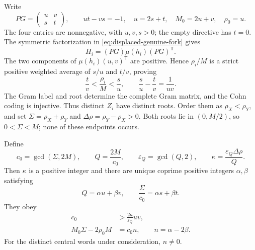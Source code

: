 Write
\begin{equation}
 PG=\begin{pmatrix}u&v\\s&t\end{pmatrix},\qquad
 ut-vs=-1,\quad u=2s+t,\quad
 M_0=2u+v,\quad\rho_0=u.
 \label{eq:displaced-prefix-frame}
\end{equation}
The four entries are nonnegative, with $u,v,s>0$; the empty directive has $t=0$. The symmetric factorization in \eqref{eq:displaced-genuine-fork} gives
$$
 H_i=(PG)\mu(h_i)(PG)^{\mathsf T}.
$$
The two components of $\mu(h_i)(u,v)^{\mathsf T}$ are positive. Hence $\rho_i/M$ is a strict positive weighted average of $s/u$ and $t/v$, proving
\begin{equation}
 \frac tv<\frac{\rho_i}{M}<\frac su,
 \qquad\frac su-\frac tv=\frac1{uv}.
 \label{eq:displaced-farey-interval}
\end{equation}
The Gram label and root determine the complete Gram matrix, and the Cohn coding is injective. Thus distinct $Z_i$ have distinct roots. Order them as $\rho_X<\rho_Y$, and set $\Sigma=\rho_X+\rho_Y$ and $\Delta\rho=\rho_Y-\rho_X>0$. Both roots lie in $(0,M/2)$, so $0<\Sigma<M$; none of these endpoints occurs.

\begin{lemma}
\label{lem:displaced-integer-direction}
Define
\begin{equation}
 c_0=\gcd(\Sigma,2M),\qquad Q=\frac{2M}{c_0},\qquad
 \varepsilon_Q=\gcd(Q,2),\qquad
 \kappa=\frac{\varepsilon_Q\Delta\rho}{Q}.
 \label{eq:displaced-reduced-midpoint}
\end{equation}
Then $\kappa$ is a positive integer and there are unique coprime positive integers $\alpha,\beta$ satisfying
\begin{equation}
 Q=\alpha u+\beta v,\qquad
 \frac\Sigma{c_0}=\alpha s+\beta t.
 \label{eq:displaced-primitive-direction}
\end{equation}
They obey
\begin{align}
 c_0&>\frac{2\kappa}{\varepsilon_Q}uv,
 \label{eq:displaced-prefix-separation}\\
 M_0\Sigma-2\rho_0M&=c_0n,\qquad n=\alpha-2\beta.
 \label{eq:displaced-integer-defect}
\end{align}
For the distinct central words under consideration, $n\ne0$.
\end{lemma}

